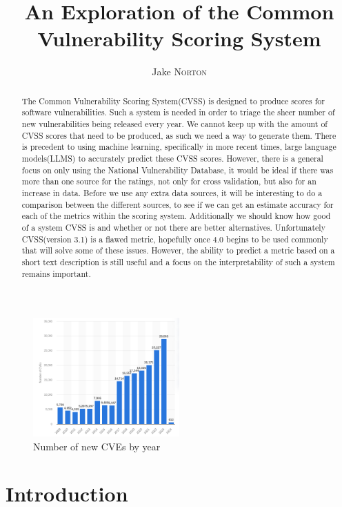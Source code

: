 \documentclass[12pt]{article}
\title{An Exploration of the Common Vulnerability Scoring System}
\author{Jake \textsc{Norton}}
\begin{document}
\maketitle

\begin{abstract}

	The Common Vulnerability Scoring System(CVSS) is designed to produce scores for software vulnerabilities. Such a system is needed in order to
	triage the sheer number of new vulnerabilities being released every year. We cannot keep up with the amount of CVSS scores that need to be
	produced, as such we need a way to generate them. There is precedent to using machine learning, specifically in more recent times, large language
	models(LLMS) to accurately predict these CVSS scores. However, there is a general focus on only using the National Vulnerability Database, it
	would be ideal if there was more than one source for the ratings, not only for cross validation, but also for an increase in data. Before we use
	any extra data sources, it will be interesting to do a comparison between the different sources, to see if we can get an estimate accuracy for
	each of the metrics within the scoring system. Additionally we should know how good of a system CVSS is and whether or not there are better
	alternatives. Unfortunately CVSS(version 3.1) is a flawed metric, hopefully once 4.0 begins to be used commonly that will solve some of these
	issues. However, the ability to predict a metric based on a short text description is still useful and a focus on the interpretability of such a
	system remains important.

\end{abstract}

\begin{figure}
	\centering
	\includegraphics[width=0.5\textwidth]{figures/cve_year.png}
	\caption{\label{fig:cve_year}Number of new CVEs by year}
\end{figure}

\section{Introduction}
\end{document}
